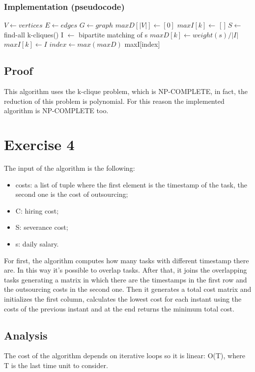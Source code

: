 \documentclass[11pt]{article}
\begin{document}
\subsubsection{Implementation (pseudocode)}
\begin{algorithm}
	\label{euclid}
	\begin{algorithmic}[1]
		\State $V \gets vertices$
		\State $E \gets edges$
		\State $G \gets graph$
		\State $maxD[|V|] \gets [0]$
		\State $maxI[k] \gets$ [ ]
		\State $S \gets$ find-all k-cliques()
		\State I $\gets$ bipartite matching of s
		\State $maxD[k] \gets weight(s)/|I|$
		\State $maxI[k] \gets I$
		\EndIf
		\EndFor
		\EndFor
		\State $index \gets max(maxD)$
		\State\Return maxI[index] 
	\end{algorithmic}
\end{algorithm}

\subsection{Proof}
This algorithm uses the k-clique problem, which is NP-COMPLETE, in fact, the reduction of this problem is polynomial. For this reason the implemented algorithm is NP-COMPLETE too.

\section{Exercise 4}
The input of the algorithm is the following:
\begin{itemize}
	\item costs: a list of tuple where the first element is the timestamp of the task, the second one is the cost of outsourcing;
	\item C: hiring cost;
	\item S: severance cost;
	\item s: daily salary.
\end{itemize}
For first, the algorithm computes how many tasks with different timestamp there are. In this way it's possible to overlap tasks.
After that, it joins the overlapping tasks generating a matrix in which there are the timestamps in the first row and the outsourcing costs in the second one.
Then it generates a total cost matrix and initializes the first column, calculates the lowest cost for each instant using the costs of the previous instant and at the end returns the minimum total cost.

\subsection{Analysis}
The cost of the algorithm depends on iterative loops so it is linear: O(T), where T is the last
time unit to consider. \\
\end{document}
